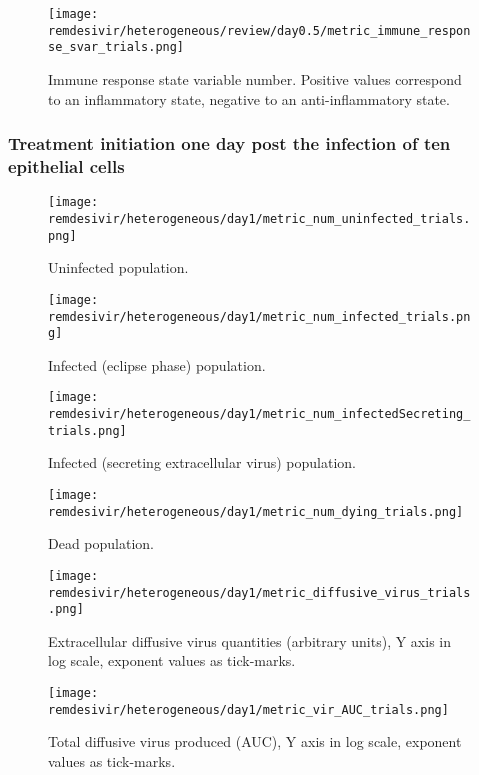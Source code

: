 \begin{figure}[H]
\texttt{[image: remdesivir/heterogeneous/review/day0.5/metric\_immune\_response\_svar\_trials.png]}
\caption{Immune response state variable number. Positive values correspond to an inflammatory state, negative to an anti-inflammatory state.\label{fig:app:hetero_regular:day0.5:immune_var}}
\end{figure}


\subsubsection{Treatment initiation one day post the infection of ten epithelial cells}\label{sup:sec:extra_figures:hetero_regular:day1}

\begin{figure}[H]
\texttt{[image: remdesivir/heterogeneous/day1/metric\_num\_uninfected\_trials.png]}
\caption{Uninfected population.\label{fig:app:hetero_regular:day1:uninf}}
\end{figure}

\begin{figure}[H]
\texttt{[image: remdesivir/heterogeneous/day1/metric\_num\_infected\_trials.png]}
\caption{Infected (eclipse phase) population.\label{fig:app:hetero_regular:day1:inf}}
\end{figure}

\begin{figure}[H]
\texttt{[image: remdesivir/heterogeneous/day1/metric\_num\_infectedSecreting\_trials.png]}
\caption{Infected (secreting extracellular virus) population.\label{fig:app:hetero_regular:day1:infSecr}}
\end{figure}

\begin{figure}[H]
\texttt{[image: remdesivir/heterogeneous/day1/metric\_num\_dying\_trials.png]}
\caption{Dead population.\label{fig:app:hetero_regular:day1:dead}}
\end{figure}

\begin{figure}[H]
\texttt{[image: remdesivir/heterogeneous/day1/metric\_diffusive\_virus\_trials.png]}
\caption{Extracellular diffusive virus quantities (arbitrary units), Y axis in log scale, exponent values as tick-marks.\label{fig:app:hetero_regular:day1:diff_vir}}
\end{figure}

\begin{figure}[H]
\texttt{[image: remdesivir/heterogeneous/day1/metric\_vir\_AUC\_trials.png]}
\caption{Total diffusive virus produced (AUC), Y axis in log scale, exponent values as tick-marks.\label{fig:app:hetero_regular:day1:auc_vir}}
\end{figure}

